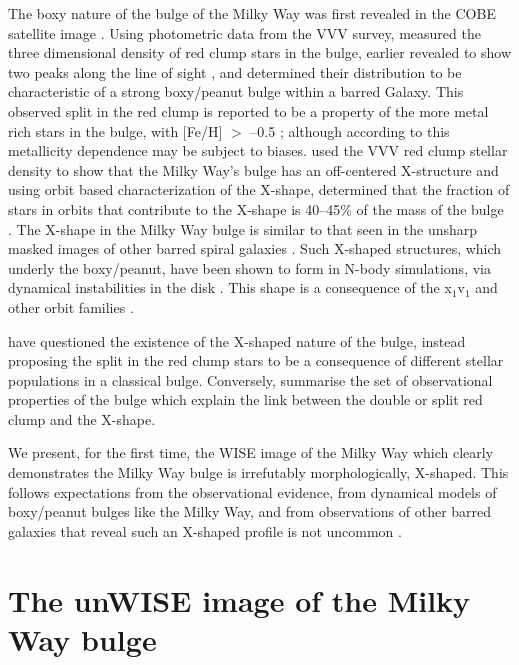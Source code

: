 \documentclass[12pt, preprint]{aastex}
\begin{document}
The boxy nature of the bulge of the Milky Way was first revealed in
the COBE satellite image \citep{Dwek1995}. Using photometric data from
the VVV survey, \citet{Wegg2013} measured the three dimensional
density of red clump stars in the bulge, earlier revealed to show two
peaks along the line of sight \citep{McWilliam2010, Nataf2010}, and
determined their distribution to be characteristic of a strong
boxy/peanut bulge within a barred Galaxy. This observed split in the
red clump is reported to be a property of the more metal rich stars in
the bulge, with [Fe/H] $>$ --0.5 \citep{Ness2012, Uttenthaler2012};
although according to \citet{Nataf2014} this metallicity dependence
may be subject to biases.  \citet{Portail2015a} used the VVV red clump
stellar density to show that the Milky Way's bulge has an off-centered
X-structure and using orbit based characterization of the
X-shape, determined that the fraction of stars in orbits that
contribute to the X-shape is 40--45\% of the mass of the bulge
\citep{Portail2015b}. The X-shape in the Milky Way bulge is similar to
that seen in the unsharp masked images of other barred spiral galaxies
\citep[e.g.][]{Bureau2006}. Such X-shaped structures, which underly
the boxy/peanut, have been shown to form in N-body simulations, via
dynamical instabilities in the disk \citep[e.g.][]{Athanassoula2005,
  Debattista2006, Inma2006}. This shape is a consequence of the
x$_{1}$v$_{1}$ \citep{P1984, Athanassoula1992} and other orbit
families \citep[e.g.][]{Portail2015b}.

\citet{Lee2015} have questioned the existence of the X-shaped nature of the bulge, instead proposing the split in the red clump stars to be a consequence of different stellar populations in a classical bulge. Conversely,  \citet{Gonzalez2015} summarise the set of observational properties of the bulge which explain the link between the double or split red clump and the X-shape.


 We present, for the first time, the WISE image of the Milky Way \citep{Lang2014a} which clearly demonstrates the Milky Way bulge is irrefutably morphologically, X-shaped. This follows expectations from the observational evidence,  from dynamical models of boxy/peanut bulges like the Milky Way, and from observations of other barred galaxies that reveal such an X-shaped profile is not uncommon \citep{L2014}. 

\section{The unWISE image of the Milky Way bulge}
\end{document}
